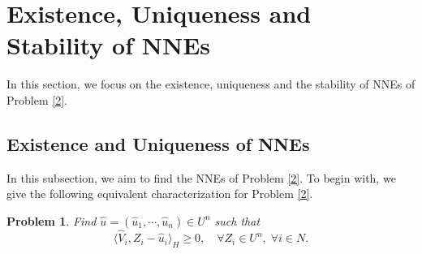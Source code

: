 \documentclass[10pt]{article}
\newtheorem{prob}{Problem}[section]
\begin{document}
\section{Existence, Uniqueness and Stability of NNEs}
In this section, we focus on the existence, uniqueness and the stability of NNEs of Problem \ref{2}.
\subsection{Existence and Uniqueness of NNEs}\label{40}
In this subsection, we aim to find the NNEs of Problem \ref{2}. To begin with, we give the following equivalent characterization for  Problem \ref{2}.
\begin{prob}\label{3}
Find $\widehat{u}=(\widehat{u}_1,\cdots,\widehat{u}_n)\in U^n$ such  that
\begin{equation}\label{5}
\langle\widehat{V}_i,Z_i-\widehat{u}_i\rangle_{H}\geq 0,\quad \forall Z_i\in U^{n}, \;\forall i\in N.
\end{equation}
\end{prob}
\end{document}
